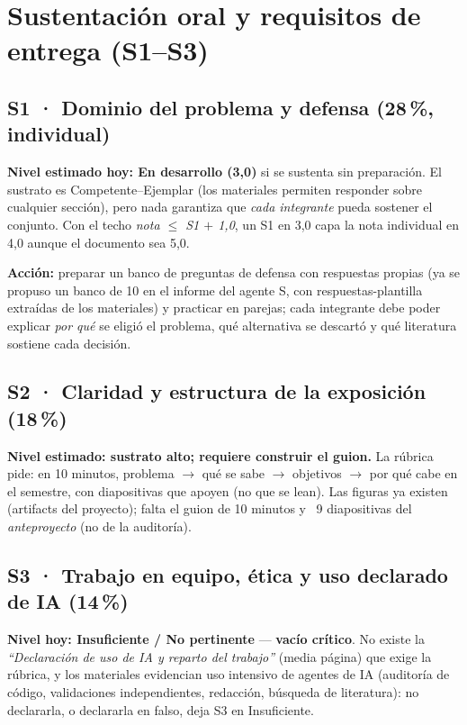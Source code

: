 \section{Sustentación oral y requisitos de entrega (S1--S3)}

\subsection{S1 · Dominio del problema y defensa (28\,\%, individual)}

\textbf{Nivel estimado hoy: En desarrollo (3,0)} si se sustenta sin preparación.
El sustrato es Competente--Ejemplar (los materiales permiten responder sobre
cualquier sección), pero nada garantiza que \emph{cada integrante} pueda
sostener el conjunto. Con el techo \emph{nota $\leq$ S1 $+$ 1,0}, un S1 en 3,0
capa la nota individual en 4,0 aunque el documento sea 5,0.

\textbf{Acción:} preparar un banco de preguntas de defensa con respuestas
propias (ya se propuso un banco de 10 en el informe del agente S, con
respuestas-plantilla extraídas de los materiales) y practicar en parejas; cada
integrante debe poder explicar \emph{por qué} se eligió el problema, qué
alternativa se descartó y qué literatura sostiene cada decisión.

\subsection{S2 · Claridad y estructura de la exposición (18\,\%)}

\textbf{Nivel estimado: sustrato alto; requiere construir el guion.} La rúbrica
pide: en 10 minutos, problema $\rightarrow$ qué se sabe $\rightarrow$ objetivos
$\rightarrow$ por qué cabe en el semestre, con diapositivas que apoyen (no que
se lean). Las figuras ya existen (artifacts del proyecto); falta el guion de 10
minutos y ~9 diapositivas del \emph{anteproyecto} (no de la auditoría).

\subsection{S3 · Trabajo en equipo, ética y uso declarado de IA (14\,\%)}

\textbf{Nivel hoy: Insuficiente / No pertinente} — \textbf{vacío crítico}. No
existe la \emph{``Declaración de uso de IA y reparto del trabajo''} (media
página) que exige la rúbrica, y los materiales evidencian uso intensivo de
agentes de IA (auditoría de código, validaciones independientes, redacción,
búsqueda de literatura): no declararla, o declararla en falso, deja S3 en
Insuficiente.

